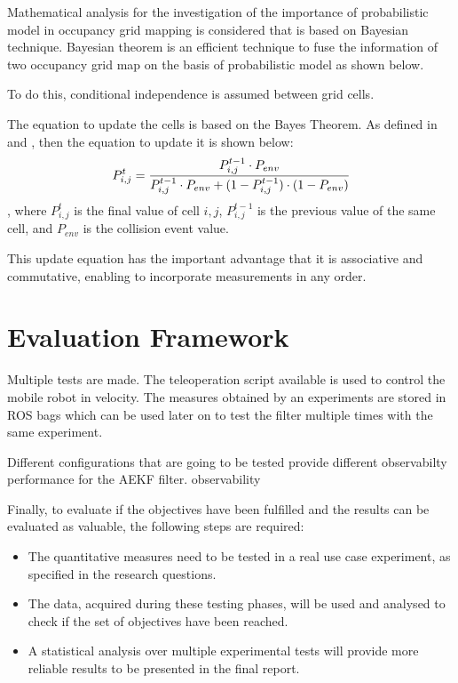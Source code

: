 Mathematical analysis for the investigation of the importance of probabilistic model in occupancy grid mapping is considered that is based on Bayesian technique. Bayesian theorem is an efficient technique to fuse the information of two occupancy grid map on the basis of probabilistic model as shown below.

To do this, conditional independence is assumed between grid cells.


The equation to update the cells is based on the Bayes Theorem.
As defined in \cite{joubert2012adaptive} and \cite{singh_sonar_2019}, then the equation to update it is shown below:
\begin{equation}
    P_{i,j}^{t} = \cfrac{P_{i,j}^{t-1} \cdot P_{env}}{P_{i,j}^{t-1} \cdot P_{env} + (1-P_{i,j}^{t-1}) \cdot (1-P_{env})}
\end{equation}
, where $P_{i,j}^{t}$ is the final value of cell $i,j$, $P_{i,j}^{t-1}$ is the previous value of the same cell, and $P_{env}$ is the collision event value.

This update equation has the important advantage that it is associative and commutative, enabling to incorporate measurements in any order.

\section{Evaluation Framework}

\label{sec:testing}

\noindent Multiple tests are made.
The teleoperation script available is used to control the mobile robot in velocity.
The measures obtained by an experiments are stored in \gls{ROS} bags which can be used later on to test the filter multiple times with the same experiment.

Different configurations that are going to be tested provide different observabilty performance for the AEKF filter.
observability



Finally, to evaluate if the objectives have been fulfilled and the results can be evaluated as valuable, the following steps are required:
\begin{itemize}
	\item The quantitative measures need to be tested in a real use case experiment, as specified in the research questions.
	\item The data, acquired during these testing phases, will be used and analysed to check if the set of objectives have been reached.
	\item A statistical analysis over multiple experimental tests will provide more reliable results to be presented in the final report.
\end{itemize}


